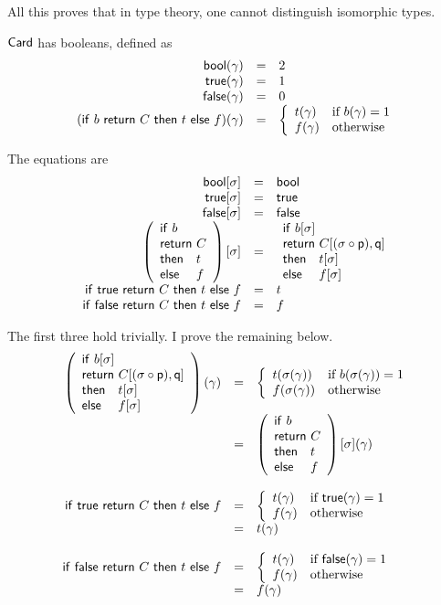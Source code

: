 All this proves that in type theory, one cannot distinguish isomorphic types.


\(\mathsf{Card}\) has booleans, defined as
\[
  \begin{array}{rcl}
    \mathsf{bool}(\gamma) &=& 2 \\
    \mathsf{true}(\gamma) &=& 1 \\
    \mathsf{false}(\gamma) &=& 0 \\
    (\mathsf{if}\ b\ \mathsf{return}\ C\ \mathsf{then}\ t\ \mathsf{else}\ f)(\gamma) &=&
    \left\{
    \begin{array}{ll}
      t(\gamma) & \text{if \(b(\gamma) = 1\)} \\
      f(\gamma) & \text{otherwise}
    \end{array}
    \right.
  \end{array}
\]

The equations are
\[
  \begin{array}{rcl}
    \bool[\sigma] &=& \bool \\
    \ttrue[\sigma] &=& \ttrue \\
    \ffalse[\sigma] &=& \ffalse \\
    \left(\fitif{b}{C}{t}{f}\right)[\sigma] &=&
    \fitif{b[\sigma]}{C[(\sigma \circ \pp), \pq]}{t[\sigma]}{f[\sigma]} \\
    \tif{\ttrue}{C}{t}{f} &=& t \\
    \tif{\ffalse}{C}{t}{f} &=& f
  \end{array}
\]

The first three hold trivially. I prove the remaining below.
\[
  \begin{array}{rcl}
    \left(
      \fitif{b[\sigma]}{C[(\sigma \circ \pp), \pq]}{t[\sigma]}{f[\sigma]}
    \right)(\gamma)
    &=&
    \left\{
    \begin{array}{ll}
      t(\sigma(\gamma)) & \text{if \(b(\sigma(\gamma)) = 1\)} \\
      f(\sigma(\gamma)) & \text{otherwise}
    \end{array}
    \right. \\
    &=& \left(\fitif{b}{C}{t}{f}\right)[\sigma](\gamma) \\
    \\
    \tif{\ttrue}{C}{t}{f}
    &=&
    \left\{
    \begin{array}{ll}
      t(\gamma) & \text{if \(\ttrue(\gamma) = 1\)} \\
      f(\gamma) & \text{otherwise}
    \end{array}
    \right. \\
    &=& t(\gamma) \\
    \\
    \tif{\ffalse}{C}{t}{f}
    &=&
    \left\{
    \begin{array}{ll}
      t(\gamma) & \text{if \(\ffalse(\gamma) = 1\)} \\
      f(\gamma) & \text{otherwise}
    \end{array}
    \right.\\
    &=& f(\gamma)
  \end{array}
\]

